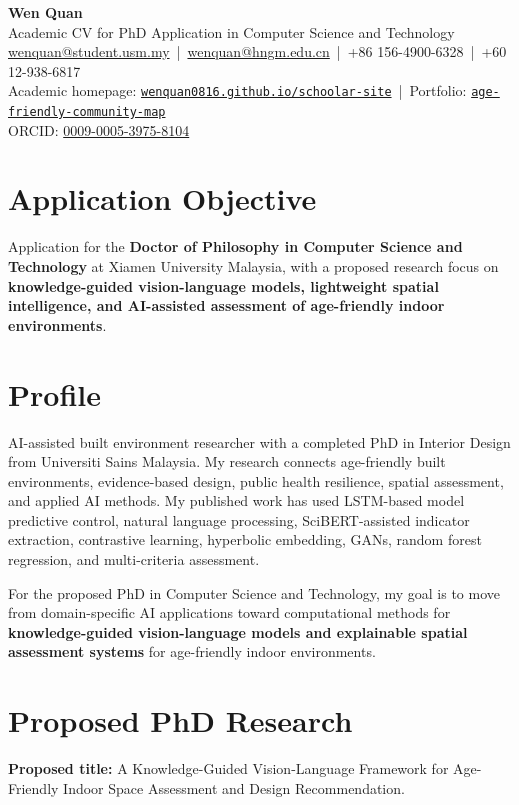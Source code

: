 \documentclass[11pt,a4paper]{article}
\begin{document}
{\LARGE \textbf{Wen Quan}}\\[-1pt]
\textcolor{subtle}{Academic CV for PhD Application in Computer Science and Technology}\\[3pt]
\href{mailto:wenquan@student.usm.my}{wenquan@student.usm.my} \,|\, 
\href{mailto:wenquan@hngm.edu.cn}{wenquan@hngm.edu.cn} \,|\, 
+86 156-4900-6328 \,|\, +60 12-938-6817\\
Academic homepage: \href{https://wenquan0816.github.io/schoolar-site/}{\nolinkurl{wenquan0816.github.io/schoolar-site}} \,|\, 
Portfolio: \href{https://wenquan0816.github.io/age-friendly-community-map/}{\nolinkurl{age-friendly-community-map}}\\
ORCID: \href{https://orcid.org/0009-0005-3975-8104}{0009-0005-3975-8104}

\section*{Application Objective}
Application for the \textbf{Doctor of Philosophy in Computer Science and Technology} at Xiamen University Malaysia, with a proposed research focus on \textbf{knowledge-guided vision-language models, lightweight spatial intelligence, and AI-assisted assessment of age-friendly indoor environments}.

\section*{Profile}
AI-assisted built environment researcher with a completed PhD in Interior Design from Universiti Sains Malaysia. My research connects age-friendly built environments, evidence-based design, public health resilience, spatial assessment, and applied AI methods. My published work has used LSTM-based model predictive control, natural language processing, SciBERT-assisted indicator extraction, contrastive learning, hyperbolic embedding, GANs, random forest regression, and multi-criteria assessment.

For the proposed PhD in Computer Science and Technology, my goal is to move from domain-specific AI applications toward computational methods for \textbf{knowledge-guided vision-language models and explainable spatial assessment systems} for age-friendly indoor environments.

\section*{Proposed PhD Research}
\textbf{Proposed title:} A Knowledge-Guided Vision-Language Framework for Age-Friendly Indoor Space Assessment and Design Recommendation.
\end{document}
